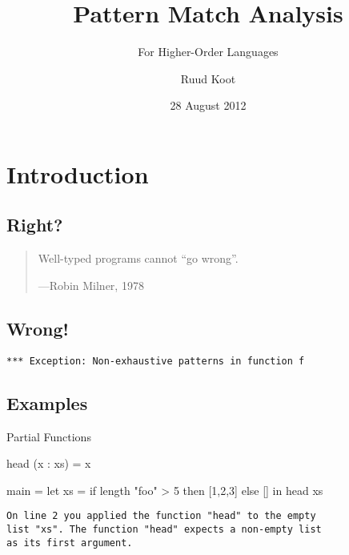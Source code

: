 \documentclass{beamer}
\begin{document}
\title{Pattern Match Analysis}
\subtitle{For Higher-Order Languages}
\author{Ruud Koot}
\date {28 August 2012}

\maketitle

\section{Introduction} %

\subsection{Right?} %

\begin{frame}%
\begin{quote}
Well-typed programs cannot ``go wrong''.

\par\noindent\hfill ---Robin Milner, 1978
\end{quote}
\end{frame}

\subsection{Wrong!} %

\begin{frame}[fragile]
\begin{verbatim}
*** Exception: Non-exhaustive patterns in function f
\end{verbatim}
\end{frame}

\subsection{Examples} %

\begin{frame}[fragile]{Partial Functions}
\begin{code}
head (x : xs) = x
\end{code}
\pause
\begin{code}
main =  let xs = if length "foo" > 5 then [1,2,3] else []
        in head xs
\end{code}
\pause
\begin{verbatim}
On line 2 you applied the function "head" to the empty
list "xs". The function "head" expects a non-empty list
as its first argument.
\end{verbatim}
\end{frame}
\end{document}

